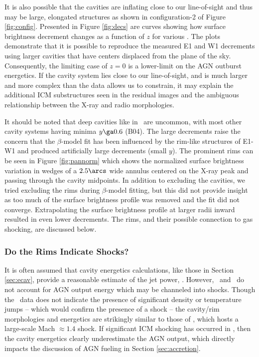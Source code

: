 \documentclass[11pt, preprint]{aastex}
\begin{document}
It is also possible that the cavities are inflating close to our
line-of-sight and thus may be large, elongated structures as shown in
configuration-2 of Figure \ref{fig:config}. Presented in Figure
\ref{fig:decs} are curves showing how surface brightness decrement
changes as a function of $z$ for various \rlos. The plots demonstrate
that it is possible to reproduce the measured E1 and W1 decrements
using larger cavities that have centers displaced from the plane of
the sky. Consequently, the limiting case of $z = 0$ is a lower-limit
on the AGN outburst energetics. If the cavity system lies close to our
line-of-sight, and is much larger and more complex than the data
allows us to constrain, it may explain the additional ICM
substructures seen in the residual images and the ambiguous
relationship between the X-ray and radio morphologies.

It should be noted that deep cavities like in \rbs\ are uncommon, with
most other cavity systems having minima $y \ga 0.6$ (B04). The large
decrements raise the concern that the $\beta$-model fit has been
influenced by the rim-like structures of E1-W1 and produced
artificially large decrements (small $y$). The prominent rims can be
seen in Figure \ref{fig:pannorm} which shows the normalized surface
brightness variation in wedges of a $2.5\arcs$ wide annulus centered
on the X-ray peak and passing through the cavity midpoints. In
addition to excluding the cavities, we tried excluding the rims during
$\beta$-model fitting, but this did not provide insight as too much of
the surface brightness profile was removed and the fit did not
converge. Extrapolating the surface brightness profile at larger radii
inward resulted in even lower decrements. The rims, and their possible
connection to gas shocking, are discussed below.

\subsubsection{Do the Rims Indicate Shocks?}
\label{sec:shocks}

It is often assumed that cavity energetics calculations, like those in
Section \ref{sec:ecav}, provide a reasonable estimate of the jet
power, \pjet. However, \pcav\ and \pjet\ do not account for AGN output
energy which may be channeled into shocks. Though the \cxo\ data does
not indicate the presence of significant density or temperature jumps
-- which would confirm the presence of a shock -- the cavity/rim
morphologies and energetics are strikingly similar to those of \ms,
which hosts a large-scale Mach $\approx 1.4$ shock. If significant ICM
shocking has occurred in \rbs, then the cavity energetics clearly
underestimate the AGN output, which directly impacts the discussion of
AGN fueling in Section \ref{sec:accretion}.
\end{document}
